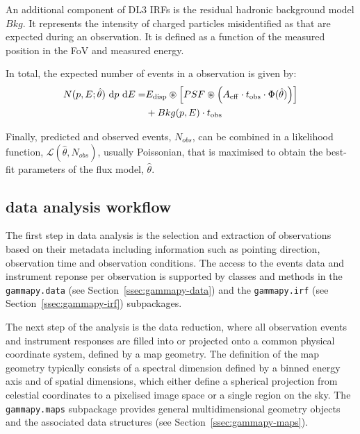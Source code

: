 \documentclass[longauth]{aa}
\newcommand{\code}[1]{\texttt{#1}}
\begin{document}

An additional component of DL3 IRFs is the residual hadronic background model $Bkg$.
It represents the intensity of charged particles misidentified as \gammarays that are expected
during an observation. It is defined as a function of the measured position in the FoV
and measured energy.

In total, the expected number of events in a \gammaray observation is given by:
\begin{equation}
	\begin{split}
  N(p, E; \hat{\theta})\ {\rm d}p\ {\rm d}E =  &E_{\rm disp} \circledast \left[ PSF \circledast \left( A_{\rm eff} \cdot t_{\rm obs} \cdot \Phi(\hat{\theta}) \right) \right]\\
                       & + Bkg(p, E) \cdot t_{\rm obs}
	\end{split}
\end{equation}
				

Finally, predicted and observed events, $N_{obs}$, can be combined in a likelihood function,
$\mathcal{L}(\hat{\theta}, N_{obs})$, usually Poissonian, that is maximised to obtain the best-fit parameters of the flux model, $\hat{\theta}$.

\subsection{\gammapy data analysis workflow}
The first step in \gammaray data analysis is the selection and extraction of observations
based on their metadata including information such as pointing direction, observation
time and observation conditions. The access to the events data and instrument 
reponse per observation is supported by classes and methods
in the \code{gammapy.data} (see Section~\ref{ssec:gammapy-data}) and the \code{gammapy.irf}
(see Section~\ref{ssec:gammapy-irf}) subpackages.

The next step of the analysis is the data reduction, where all observation events and instrument
responses are filled into or projected onto a common physical coordinate system, defined by
a map geometry. The definition of the map geometry typically consists of a spectral dimension
defined by a binned energy axis and of spatial dimensions, which either define 
a spherical projection from celestial coordinates to a pixelised image space
or a single region on the sky. The \code{gammapy.maps} subpackage provides
general multidimensional geometry objects and the associated data structures
(see Section~\ref{ssec:gammapy-maps}).
\end{document}
